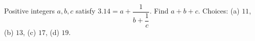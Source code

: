 Positive integers $a,b,c$ satisfy $3.14=a+\dfrac{1}{b+\dfrac{1}{c}}$. Find $a+b+c$. Choices: (a) $11$, (b) $13$, (c) $17$, (d) $19$.
